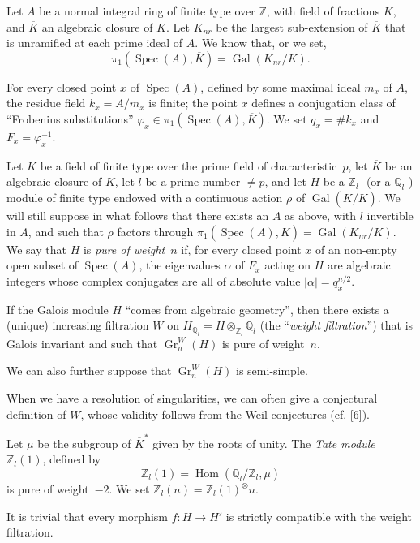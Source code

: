 \documentclass{article}
\theoremstyle{plain}
\theoremstyle{definition}
\newenvironment{principle}[1]
    {\renewcommand\theinnercustomprinciple{#1}\innercustomprinciple}
    {\endinnercustomprinciple}
\newcommand{\ZZ}{\mathbb{Z}}
\newcommand{\QQ}{\mathbb{Q}}
\DeclareMathOperator{\Gr}{Gr}
\DeclareMathOperator{\Gal}{Gal}
\DeclareMathOperator{\Spec}{Spec}
\DeclareMathOperator{\Hom}{Hom}
\newcommand{\oldpage}[1]{\marginpar{\footnotesize$\Big\vert$ \textit{p.~#1}}}
\begin{document}
Let $A$ be a normal integral ring of finite type over $\ZZ$, with field of fractions $K$,
\oldpage{426}
and $\overline{K}$ an algebraic closure of $K$.
Let $K_{nr}$ be the largest sub-extension of $\overline{K}$ that is unramified at each prime ideal of $A$.
We know that, or we set,
\[
  \pi_1(\Spec(A),\overline{K}) = \Gal(K_{nr}/K).
\]

For every closed point $x$ of $\Spec(A)$, defined by some maximal ideal $m_x$ of $A$, the residue field $k_x=A/m_x$ is finite;
the point $x$ defines a conjugation class of ``Frobenius substitutions'' $\varphi_x\in\pi_1(\Spec(A),\overline{K})$.
We set $q_x=\#k_x$ and $F_x=\varphi_x^{-1}$.

Let $K$ be a field of finite type over the prime field of characteristic~$p$, let $\overline{K}$ be an algebraic closure of $K$, let $l$ be a prime number $\neq p$, and let $H$ be a $\ZZ_l$- (or a $\QQ_l$-) module of finite type endowed with a continuous action $\rho$ of $\Gal(\overline{K}/K)$.
We will still suppose in what follows that there exists an $A$ as above, with $l$ invertible in $A$, and such that $\rho$ factors through $\pi_1(\Spec(A),\overline{K}) = \Gal(K_{nr}/K)$.
We say that $H$ is \emph{pure of weight~$n$} if, for every closed point $x$ of an non-empty open subset of $\Spec(A)$, the eigenvalues $\alpha$ of $F_x$ acting on $H$ are algebraic integers whose complex conjugates are all of absolute value $|\alpha|=q_x^{n/2}$.

\begin{principle}{2.1}
\label{principle-2.1}
  If the Galois module $H$ ``comes from algebraic geometry'', then there exists a (unique) increasing filtration $W$ on $H_{\QQ_l}=H\otimes_{\ZZ_l}\QQ_l$ (the ``\emph{weight filtration}'') that is Galois invariant and such that $\Gr_n^W(H)$ is pure of weight~$n$.
\end{principle}

We can also further suppose that $\Gr_n^W(H)$ is semi-simple.

When we have a resolution of singularities, we can often give a conjectural definition of $W$, whose validity follows from the Weil conjectures \cite{5} (cf. \cref{6}).

Let $\mu$ be the subgroup of $\overline{K}^*$ given by the roots of unity.
The \emph{Tate module $\ZZ_l(1)$}, defined by
\[
  \ZZ_l(1) = \Hom(\QQ_l/\ZZ_l,\mu)
\]
is pure of weight~$-2$.
We set $\ZZ_l(n)=\ZZ_l(1)^\otimes n$.

It is trivial that every morphism $f\colon H\to H'$ is strictly compatible with the weight filtration.
\end{document}
